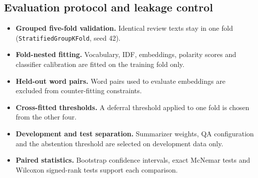 \documentclass[11pt,a4paper]{article}
\begin{document}
\subsection{Evaluation protocol and leakage control}
\begin{itemize}
\item \textbf{Grouped five-fold validation.} Identical review texts stay in one fold (\texttt{StratifiedGroupKFold}, seed 42).
\item \textbf{Fold-nested fitting.} Vocabulary, IDF, embeddings, polarity scores and classifier calibration are fitted on the training fold only.
\item \textbf{Held-out word pairs.} Word pairs used to evaluate embeddings are excluded from counter-fitting constraints.
\item \textbf{Cross-fitted thresholds.} A deferral threshold applied to one fold is chosen from the other four.
\item \textbf{Development and test separation.} Summarizer weights, QA configuration and the abstention threshold are selected on development data only.
\item \textbf{Paired statistics.} Bootstrap confidence intervals, exact McNemar tests and Wilcoxon signed-rank tests support each comparison.
\end{itemize}
\end{document}
